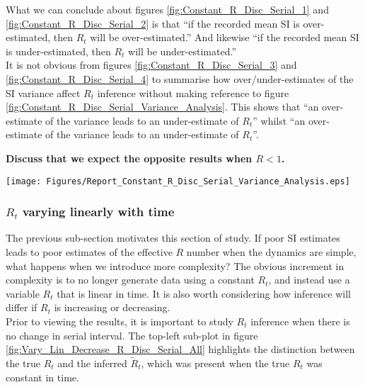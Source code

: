 \documentclass[10pt,journal,compsoc]{IEEEtran}
\begin{document}
What we can conclude about figures \ref{fig:Constant_R_Disc_Serial_1} and \ref{fig:Constant_R_Disc_Serial_2} is that ``if the recorded mean SI is over-estimated, then $R_t$ will be over-estimated.'' And likewise ``if the recorded mean SI is under-estimated, then $R_t$ will be under-estimated.''\\
It is not obvious from figures \ref{fig:Constant_R_Disc_Serial_3} and \ref{fig:Constant_R_Disc_Serial_4} to summarise how over/under-estimates of the SI variance affect $R_t$ inference without making reference to figure \ref{fig:Constant_R_Disc_Serial_Variance_Analysis}. This shows that ``an over-estimate of the variance leads to an under-estimate of $R_t$'' whilst ``an over-estimate of the variance leads to an under-estimate of $R_t$''.

\textbf{Discuss that we expect the opposite results when $R<1$.}

\begin{minipage}{\linewidth}
\centering
\texttt{[image: Figures/Report\_Constant\_R\_Disc\_Serial\_Variance\_Analysis.eps]}
\label{fig:Constant_R_Disc_Serial_Variance_Analysis}
\end{minipage}
  
\subsubsection{$R_t$ varying linearly with time}\label{sect::Linear_R}

The previous sub-section motivates this section of study. If poor SI estimates leads to poor estimates of the effective $R$ number when the dynamics are simple, what happens when we introduce more complexity? The obvious increment in complexity is to no longer generate data using a constant $R_t$, and instead use a variable $R_t$ that is linear in time. It is also worth considering how inference will differ if $R_t$ is increasing or decreasing.\\

Prior to viewing the results, it is important to study $R_t$ inference when there is no change in serial interval. The top-left sub-plot in figure \ref{fig:Vary_Lin_Decrease_R_Disc_Serial_All} highlights the distinction between the true $R_t$ and the inferred $\tilde{R}_t$, which was present when the true $R_t$ was constant in time.
\end{document}

